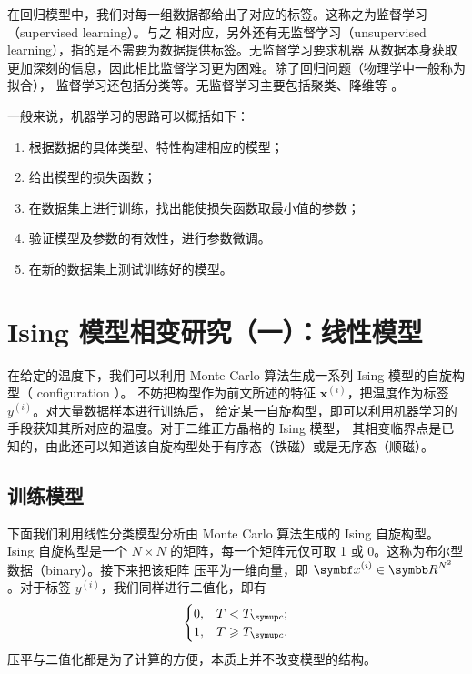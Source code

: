 在回归模型中，我们对每一组数据都给出了对应的标签。这称之为监督学习（supervised learning）。与之
相对应，另外还有无监督学习（unsupervised learning），指的是不需要为数据提供标签。无监督学习要求机器
从数据本身获取更加深刻的信息，因此相比监督学习更为困难。除了回归问题（物理学中一般称为拟合），
监督学习还包括分类等。无监督学习主要包括聚类、降维等 \cite{zhouzhihua,wiki:ml}。

一般来说，机器学习的思路可以概括如下：

\begin{enumerate}
  \item 根据数据的具体类型、特性构建相应的模型；
  \item 给出模型的损失函数；
  \item 在数据集上进行训练，找出能使损失函数取最小值的参数；
  \item 验证模型及参数的有效性，进行参数微调。
  \item 在新的数据集上测试训练好的模型。
\end{enumerate}

\section{Ising 模型相变研究（一）：线性模型}

在给定的温度下，我们可以利用 Monte Carlo 算法生成一系列 Ising 模型的自旋构型（ configuration ）。
不妨把构型作为前文所述的特征 $\bm{x}^{(i)}$，把温度作为标签 $y^{(i)}$。对大量数据样本进行训练后，
给定某一自旋构型，即可以利用机器学习的手段获知其所对应的温度。对于二维正方晶格的 Ising 模型，
其相变临界点是已知的，由此还可以知道该自旋构型处于有序态（铁磁）或是无序态（顺磁）。

\subsection{训练模型}

下面我们利用线性分类模型分析由 Monte Carlo 算法生成的 Ising 自旋构型。Ising 自旋构型是一个
$N\times N$ 的矩阵，每一个矩阵元仅可取 1 或 0。这称为布尔型数据（binary）。接下来把该矩阵
压平为一维向量，即 $\bm{x}^{(i)}\in\R^{N^2}$。对于标签 $y^{(i)}$，我们同样进行二值化，即有
\begin{equation}
  \begin{cases}
    0, & T <         \Tc; \\
    1, & T \geqslant \Tc.
  \end{cases}
\end{equation}
压平与二值化都是为了计算的方便，本质上并不改变模型的结构。

